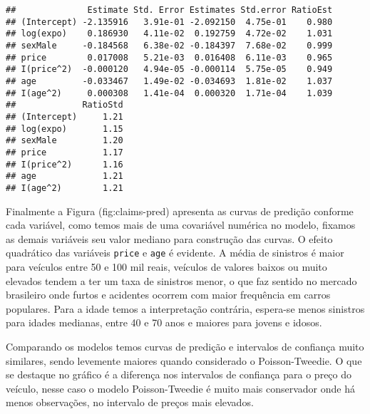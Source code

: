 \documentclass[9pt,a5paper,]{book}
\theoremstyle{definition}
\theoremstyle{definition}
\theoremstyle{remark}
\begin{document}
\begin{verbatim}
##              Estimate Std. Error Estimates Std.error RatioEst
## (Intercept) -2.135916   3.91e-01 -2.092150  4.75e-01    0.980
## log(expo)    0.186930   4.11e-02  0.192759  4.72e-02    1.031
## sexMale     -0.184568   6.38e-02 -0.184397  7.68e-02    0.999
## price        0.017008   5.21e-03  0.016408  6.11e-03    0.965
## I(price^2)  -0.000120   4.94e-05 -0.000114  5.75e-05    0.949
## age         -0.033467   1.49e-02 -0.034693  1.81e-02    1.037
## I(age^2)     0.000308   1.41e-04  0.000320  1.71e-04    1.039
##             RatioStd
## (Intercept)     1.21
## log(expo)       1.15
## sexMale         1.20
## price           1.17
## I(price^2)      1.16
## age             1.21
## I(age^2)        1.21
\end{verbatim}

Finalmente a Figura (fig:claims-pred) apresenta as curvas de
predição conforme cada variável, como temos mais de uma covariável
numérica no modelo, fixamos as demais variáveis seu valor mediano para
construção das curvas. O efeito quadrático das variáveis \texttt{price}
e \texttt{age} é evidente. A média de sinistros é maior para veículos
entre 50 e 100 mil reais, veículos de valores baixos ou muito elevados
tendem a ter um taxa de sinistros menor, o que faz sentido no mercado
brasileiro onde furtos e acidentes ocorrem com maior frequência em
carros populares. Para a idade temos a interpretação contrária,
espera-se menos sinistros para idades medianas, entre 40 e 70 anos e
maiores para jovens e idosos.

Comparando os modelos temos curvas de predição e intervalos de confiança
muito similares, sendo levemente maiores quando considerado o
Poisson-Tweedie. O que se destaque no gráfico é a diferença nos
intervalos de confiança para o preço do veículo, nesse caso o modelo
Poisson-Tweedie é muito mais conservador onde há menos observações, no
intervalo de preços mais elevados.
\end{document}
